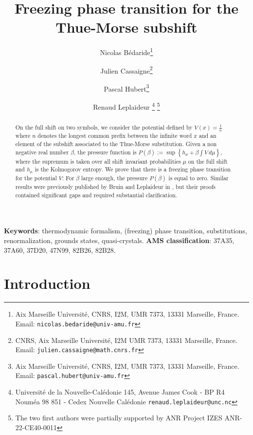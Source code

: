 \documentclass[11 pt]{article}
\def\be{\beta}
\theoremstyle{definition}
\begin{document}

\title{Freezing phase transition for the Thue-Morse subshift}
\author{
Nicolas Bédaride\footnote{
    Aix Marseille Université, CNRS,
     I2M, UMR 7373, 13331 Marseille, France.
    Email: \texttt{nicolas.bedaride@univ-amu.fr}} 
    \and 
        Julien Cassaigne\footnote{
     CNRS,
     Aix Marseille Université, I2M UMR 7373, 13331 Marseille, France.
    Email: \texttt{julien.cassaigne@math.cnrs.fr}}
    \and 
       Pascal Hubert\footnote{
    Aix Marseille Université, CNRS,
     I2M, UMR 7373, 13331 Marseille, France.
    Email: \texttt{pascal.hubert@univ-amu.fr}}
    \and 
    Renaud Leplaideur%
      \footnote{Université de la Nouvelle-Calédonie 145, Avenue James Cook - BP R4 Nouméa 98 851 - Cedex Nouvelle Calédonie
    \texttt{renaud.leplaideur@unc.nc}}
    \thanks{The two first authors were partially supported by 
ANR Project IZES ANR-22-CE40-0011}
}


\date{}
\maketitle

\begin{abstract}
On the full shift on two symbols, we consider the potential defined by $V(x) = \frac{1}{n}$ where $n$ denotes the longest common prefix between the infinite word $x$ and an element of the subshift associated to the Thue-Morse substitution. Given a non negative real number $\beta$, the pressure function is 
$P(\be):=\sup\left\{h_{\mu}+\be\int V\,d\mu\right\},$ where the supremum is taken over all shift invariant probabilities $\mu$ on the full shift and $h_{\mu}$ is the Kolmogorov entropy.
We prove that there is a freezing phase transition for the potential $V$: For $\beta$ large enough, the pressure $P(\be)$ is equal to zero.
Similar results were previously published by Bruin and Leplaideur in \cite{BL2}, \cite{Bruin-Leplaid-13}  but their proofs contained significant gaps and required substantial clarification. 
\end{abstract}
{\bf Keywords}: thermodynamic formalism, (freezing) phase transition, substitutions, renormalization, grounds states, quasi-crystals.
{\bf AMS classification}: 37A35, 37A60, 37D20, 47N99, 82B26, 82B28.


\section{Introduction}
\end{document}

